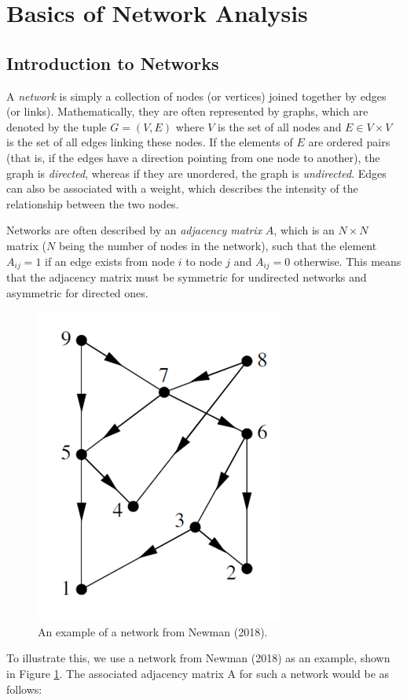 \documentclass[12pt,letterpaper]{report}
\begin{document}
\section{Basics of Network Analysis}
\label{sec:31Basics}

\subsection{Introduction to Networks}
\label{ssec:311Intro}

	A \textit{network} is simply a collection of nodes (or vertices) joined together by edges (or links). Mathematically, they are often represented by graphs, which are denoted by the tuple $G = (V,E)$ where $V$ is the set of all nodes and $E \in V \times V$ is the set of all edges linking these nodes. If the elements of $E$ are ordered pairs (that is, if the edges have a direction pointing from one node to another), the graph is \textit{directed}, whereas if they are unordered, the graph is \textit{undirected}. Edges can also be associated with a weight, which describes the intensity of the relationship between the two nodes.
	
	Networks are often described by an \textit{adjacency matrix} $A$, which is an $N \times N$ matrix ($N$ being the number of nodes in the network), such that the element $A_{ij}  = 1$ if an edge exists from node $i$ to node $j$ and $A_{ij}  = 0$ otherwise. This means that the adjacency matrix must be symmetric for undirected networks and asymmetric for directed ones. 

\begin{figure}[!h]
\centering
\includegraphics[width=0.3\columnwidth]{Fig301-Network.png}
\caption{An example of a network from Newman (2018).}\label{fig:301Network}
\end{figure}
	
	To illustrate this, we use a network from Newman (2018) as an example, shown in Figure \ref{fig:301Network}. The associated adjacency matrix A for such a network would be as follows:
\end{document}
